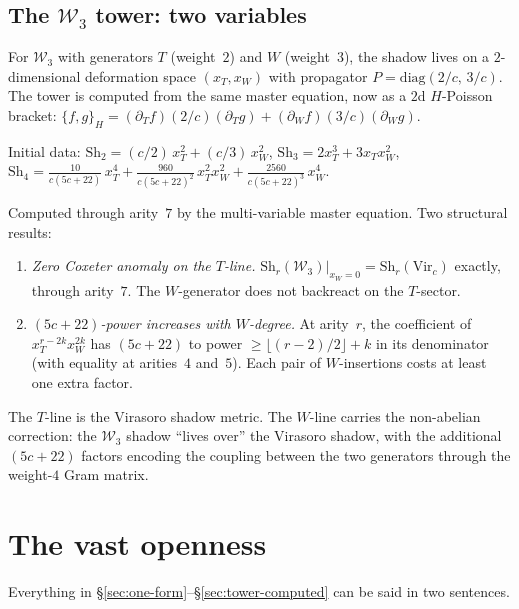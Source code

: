 \documentclass[11pt]{article}
\newcommand{\cW}{\mathcal{W}}
\begin{document}
\subsection*{The $\cW_3$ tower: two variables}

For $\cW_3$ with generators $T$ (weight~$2$) and $W$ (weight~$3$),
the shadow lives on a $2$-dimensional deformation space
$(x_T, x_W)$ with propagator
$P = \mathrm{diag}(2/c,\, 3/c)$.  The tower is computed from the
same master equation, now as a $2$d $H$-Poisson bracket:
$\{f, g\}_H = (\partial_T f)(2/c)(\partial_T g)
+ (\partial_W f)(3/c)(\partial_W g)$.

Initial data:
$\mathrm{Sh}_2 = (c/2)\,x_T^2 + (c/3)\,x_W^2$,\enspace
$\mathrm{Sh}_3 = 2x_T^3 + 3 x_T x_W^2$,\enspace
$\mathrm{Sh}_4 = \tfrac{10}{c(5c{+}22)}\,x_T^4
+ \tfrac{960}{c(5c{+}22)^2}\,x_T^2 x_W^2
+ \tfrac{2560}{c(5c{+}22)^3}\,x_W^4$.

Computed through arity~$7$ by the multi-variable master equation.
Two structural results:

\begin{enumerate}[label=(\roman*)]
\item \emph{Zero Coxeter anomaly on the $T$-line.}
  $\mathrm{Sh}_r(\cW_3)|_{x_W=0} = \mathrm{Sh}_r(\mathrm{Vir}_c)$
  exactly, through arity~$7$.  The $W$-generator does not
  backreact on the $T$-sector.

\item \emph{$(5c{+}22)$-power increases with $W$-degree.}
  At arity~$r$, the coefficient of $x_T^{r-2k} x_W^{2k}$ has
  $(5c{+}22)$ to power $\geq \lfloor(r-2)/2\rfloor + k$ in its
  denominator (with equality at arities~$4$ and~$5$).
  Each pair of $W$-insertions costs at least one extra factor.
\end{enumerate}

The $T$-line is the Virasoro shadow metric.  The $W$-line carries
the non-abelian correction: the $\cW_3$ shadow ``lives over'' the
Virasoro shadow, with the additional $(5c{+}22)$ factors encoding
the coupling between the two generators through the weight-$4$
Gram matrix.


\section{The vast openness}
\label{sec:openness}

Everything in \S\ref{sec:one-form}--\S\ref{sec:tower-computed}
can be said in two sentences.
\end{document}
